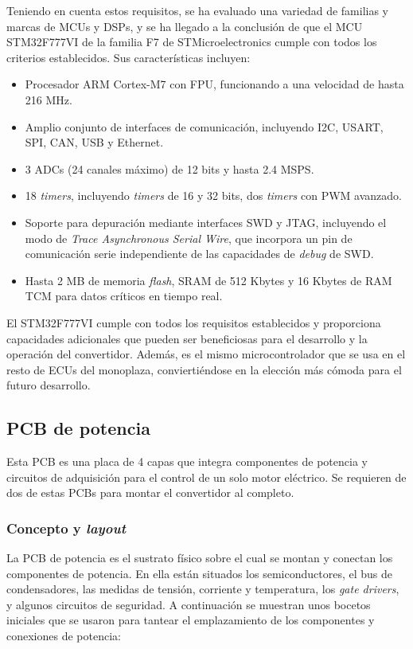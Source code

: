 Teniendo en cuenta estos requisitos, se ha evaluado una variedad de familias y marcas de MCUs y DSPs, y se ha llegado a la conclusión de que el MCU STM32F777VI de la familia F7 de STMicroelectronics cumple con todos los criterios establecidos. Sus características incluyen:

\begin{itemize}
	\item Procesador ARM Cortex-M7 con FPU, funcionando a una velocidad de hasta 216 MHz.
	\item Amplio conjunto de interfaces de comunicación, incluyendo I2C, USART, SPI, CAN, USB y Ethernet.
	\item 3 ADCs (24 canales máximo) de 12 bits y hasta 2.4 MSPS.
	\item 18 \textit{timers}, incluyendo \textit{timers} de 16 y 32 bits, dos \textit{timers} con PWM avanzado.
	\item Soporte para depuración mediante interfaces SWD y JTAG, incluyendo el modo de \textit{Trace Asynchronous Serial Wire}, que incorpora un pin de comunicación serie independiente de las capacidades de \textit{debug} de SWD.
	\item Hasta 2 MB de memoria \textit{flash}, SRAM de 512 Kbytes y 16 Kbytes de RAM TCM para datos críticos en tiempo real.
\end{itemize}

El STM32F777VI cumple con todos los requisitos establecidos y proporciona capacidades adicionales que pueden ser beneficiosas para el desarrollo y la operación del convertidor. Además, es el mismo microcontrolador que se usa en el resto de ECUs del monoplaza, conviertiéndose en la elección más cómoda para el futuro desarrollo.

\subsection{PCB de potencia}

Esta PCB es una placa de 4 capas que integra componentes de potencia y circuitos de adquisición para el control de un solo motor eléctrico. Se requieren de dos de estas PCBs para montar el convertidor al completo.

\subsubsection{Concepto y \textit{layout}}

La PCB de potencia es el sustrato físico sobre el cual se montan y conectan los componentes de potencia. En ella están situados los semiconductores, el bus de condensadores, las medidas de tensión, corriente y temperatura, los \textit{gate drivers}, y algunos circuitos de seguridad. A continuación se muestran unos bocetos iniciales que se usaron para tantear el emplazamiento de los componentes y conexiones de potencia:

